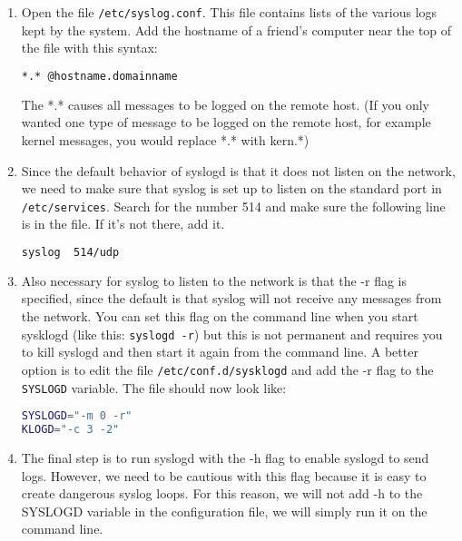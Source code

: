 \documentclass{article}
\begin{document}
\begin{enumerate}

\item Open the file \verb|/etc/syslog.conf|. This file contains lists of the various logs kept by the system. Add the hostname of a friend's computer near the top of the file with this syntax:

\begin{lstlisting}[basicstyle=\ttfamily, backgroundcolor = \color{lightgray}, language = bash, xleftmargin = 0cm, framexleftmargin = 1em]
*.*	@hostname.domainname
\end{lstlisting}

The *.* causes all messages to be logged on the remote host. (If you only wanted one type of message to be logged on the remote host, for example kernel messages, you would replace *.* with kern.*)

\item Since the default behavior of syslogd is that it does not listen on the network, we need to make sure that syslog is set up to listen on the standard port in \verb|/etc/services|. Search for the number 514 and make sure the following line is in the file. If it's not there, add it.

\begin{lstlisting}[basicstyle=\ttfamily, backgroundcolor = \color{lightgray}, language = bash, xleftmargin = 0cm, framexleftmargin = 1em]
syslog	514/udp
\end{lstlisting}

\item Also necessary for syslog to listen to the network is that the -r flag is specified, since the default is that syslog will not receive any messages from the network. You can set this flag on the command line when you start sysklogd (like this:  \verb|syslogd -r|) but this is not permanent and requires you to kill syslogd and then start it again from the command line. A better option is to edit the file \verb|/etc/conf.d/sysklogd| and add the -r flag to the \verb|SYSLOGD| variable. The file should now look like:

\begin{lstlisting}[basicstyle=\ttfamily, backgroundcolor = \color{lightgray}, language = bash, xleftmargin = 0cm, framexleftmargin = 1em]
SYSLOGD="-m 0 -r"
KLOGD="-c 3 -2"
\end{lstlisting}

\item The final step is to run syslogd with the -h flag to enable syslogd to send logs. However, we need to be cautious with this flag because it is easy to create dangerous syslog loops. For this reason, we will not add -h to the SYSLOGD variable in the configuration file, we will simply run it on the command line.


\end{enumerate}
\end{document}

